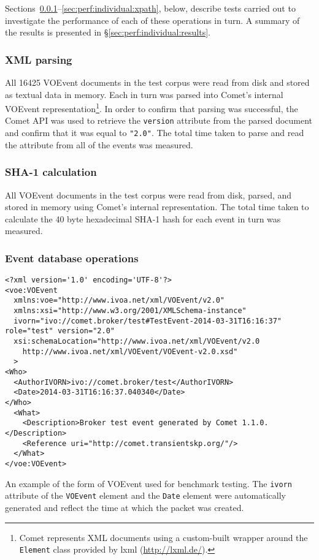 \documentclass[5p,authoryear]{elsarticle}
\begin{document}
Sections~\ref{sec:perf:individual:parse}--\ref{sec:perf:individual:xpath},
below, describe tests carried out to investigate the performance of each of
these operations in turn. A summary of the results is presented in
\S\ref{sec:perf:individual:results}.

\subsubsection{XML parsing}
\label{sec:perf:individual:parse}

All 16425 VOEvent documents in the test corpus were read from disk and stored
as textual data in memory. Each in turn was parsed into Comet's internal
VOEvent representation\footnote{Comet represents XML documents using a
custom-built wrapper around the \texttt{Element} class provided by lxml
(\url{http://lxml.de/}).}. In order to confirm that parsing was successful,
the Comet API was used to retrieve the \texttt{version} attribute from the
parsed document and confirm that it was equal to \texttt{"2.0"}. The total
time taken to parse and read the attribute from all of the events was
measured.

\subsubsection{SHA-1 calculation}
\label{sec:perf:individual:hash}

All VOEvent documents in the test corpus were read from disk, parsed, and
stored in memory using Comet's internal representation. The total time taken
to calculate the 40 byte hexadecimal SHA-1 hash for each event in turn was
measured.

\subsubsection{Event database operations}
\label{sec:perf:individual:eventdb}

\begin{listing*}
\begin{verbatim}
<?xml version='1.0' encoding='UTF-8'?>
<voe:VOEvent
  xmlns:voe="http://www.ivoa.net/xml/VOEvent/v2.0"
  xmlns:xsi="http://www.w3.org/2001/XMLSchema-instance"
  ivorn="ivo://comet.broker/test#TestEvent-2014-03-31T16:16:37" role="test" version="2.0"
  xsi:schemaLocation="http://www.ivoa.net/xml/VOEvent/v2.0
    http://www.ivoa.net/xml/VOEvent/VOEvent-v2.0.xsd"
  >
<Who>
  <AuthorIVORN>ivo://comet.broker/test</AuthorIVORN>
  <Date>2014-03-31T16:16:37.040340</Date>
</Who>
  <What>
    <Description>Broker test event generated by Comet 1.1.0.</Description>
    <Reference uri="http://comet.transientskp.org/"/>
  </What>
</voe:VOEvent>
\end{verbatim}
\caption{An example of the form of VOEvent used for benchmark testing. The
\texttt{ivorn} attribute of the \texttt{VOEvent} element and the \texttt{Date}
element were automatically generated and reflect the time at which the packet
was created.}
\label{lst:testmessage}
\end{listing*}
\end{document}
